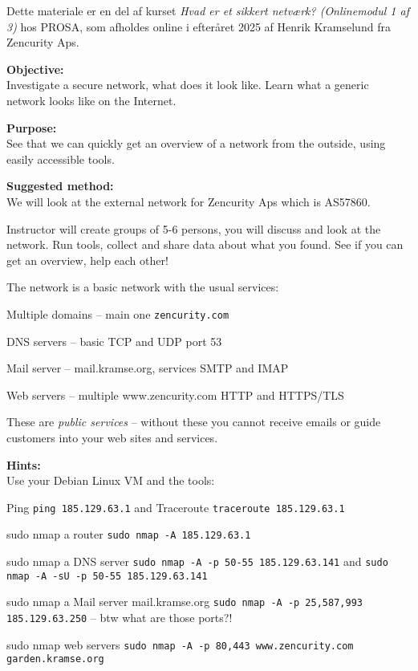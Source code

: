 \documentclass[a4paper,11pt,notitlepage,landscape]{report}
\begin{document}
\rm
{}

\newcommand{\subject}[1]{PROSA: Hvad er et sikkert netværk?}


\normal

Dette materiale er en del af kurset
\emph{Hvad er et sikkert netværk? (Onlinemodul 1 af 3)} hos PROSA, som afholdes online i efteråret 2025 af Henrik Kramselund fra Zencurity Aps.

{\bf Objective:}\\
Investigate a secure network, what does it look like. Learn what a generic network looks like on the Internet.

{\bf Purpose:}\\
See that we can quickly get an overview of a network from the outside, using easily accessible tools.

{\bf Suggested method:}\\
We will look at the external network for Zencurity Aps which is AS57860.

Instructor will create groups of 5-6 persons, you will discuss and look at the network. Run tools, collect and share data about what you found. See if you can get an overview, help each other!


The network is a basic network with the usual services:
\begin{list1}
\item[\faSquareO] Multiple domains -- main one \verb+zencurity.com+
\item[\faSquareO] DNS servers -- basic TCP and UDP port 53
\item[\faSquareO] Mail server -- mail.kramse.org, services SMTP and IMAP
\item[\faSquareO] Web servers -- multiple www.zencurity.com HTTP and HTTPS/TLS
\end{list1}

These are \emph{public services} -- without these you cannot receive emails or guide customers into your web sites and services.

\eject
{\bf Hints:}\\
Use your Debian Linux VM and the tools:

\begin{list2}
\item Ping \verb+ping 185.129.63.1+ and Traceroute \verb+traceroute 185.129.63.1+
\item sudo nmap a router \verb+sudo nmap -A 185.129.63.1+
\item sudo nmap a DNS server \verb+sudo nmap -A -p 50-55 185.129.63.141+ and  \verb+sudo nmap -A -sU -p 50-55 185.129.63.141+
\item sudo nmap a Mail server mail.kramse.org \verb+sudo nmap -A -p 25,587,993 185.129.63.250+ -- btw what are those ports?!
\item sudo nmap web servers \verb+sudo nmap -A -p 80,443 www.zencurity.com garden.kramse.org+
\end{list2}
\end{document}
